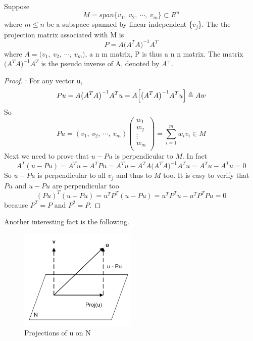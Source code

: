 \begin{lem}
Suppose \[ M = span \bigl\{v_1,\ v_2,\ \cdots,\ v_m \bigr\} \subset R^n\] where $m \leq n$ be a subspace spanned by linear independent \{$v_j$\}. The the projection matrix associated with M is
\[P = A\bigl(A^TA\bigr)^{-1}A^T\]
where $A = \bigl(v_1,\ v_2,\ \cdots,\ v_m\bigr)$, a n \texttimes m matrix, P is thus a n \texttimes n matrix. The matrix $\bigl(A^TA\bigr)^{-1}A^T$ is the pseudo inverse of A, denoted by $A^+$.
\end{lem}
\begin{proof}: For any vector u, 
\[Pu = A\bigl(A^TA\bigr)^{-1}A^Tu = A\Bigl[\bigl(A^TA\bigr)^{-1}A^Tu\Bigr] \triangleq Aw\]
So
\[Pu = (v_1,\ v_2,\ \cdots,\ v_m)
\left( \begin{array}{c} w_1\\ w_2\\ \vdots\\ w_m\\ \end{array} \right)
= \sum_{i=1}^m w_iv_i \in M \]
Next we need to prove that $u-Pu$ is perpendicular to $M$. In fact
\[A^T(u-Pu) = A^Tu - A^TPu = A^Tu - A^TA\bigl(A^TA\bigr)^{-1}A^Tu = A^Tu - A^Tu = 0\]
So $u-Pu$ is perpendicular to all ${v_j}$ and thus to $M$ too. 
It is easy to verify that $Pu$ and $u - Pu$ are perpendicular too
\[(Pu)^T(u-Pu) = u^TP^T(u-Pu) = u^TP^Tu - u^TP^TPu = 0\]
because $P^T = P$ and $P^2 = P$.
\end{proof}
Another interesting fact is the following.
\begin{figure}[htp]
\centerline{
\includegraphics[bb=20 0 200 200,width=0.5\textwidth] {chap4/projection3.png}
}
\caption{Projections of u on N}
\label{figure:projection3}
\end{figure}

